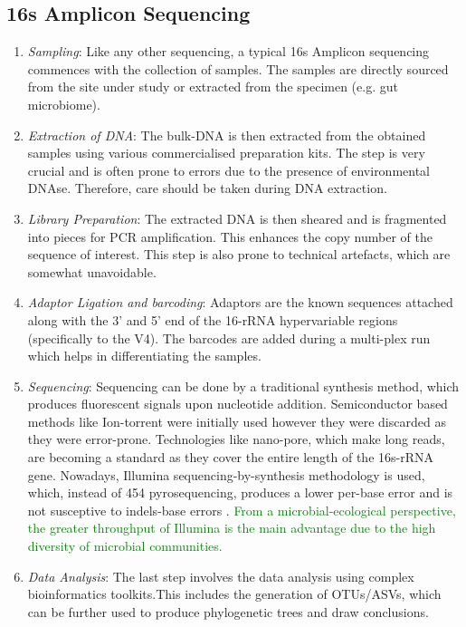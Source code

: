 \subsection{16s Amplicon Sequencing}

\begin{enumerate}
  \item \textit{Sampling}: Like any other sequencing, a typical 16s Amplicon sequencing commences with the collection of samples. The samples are directly sourced from the site under study or extracted from the specimen (e.g. gut microbiome).
  \item \textit{Extraction of DNA}: The bulk-DNA is then extracted from the obtained samples using various commercialised preparation kits. The step is very crucial and is often prone to errors due to the presence of environmental DNAse. Therefore, care should be taken during DNA extraction.
  \item \textit{Library Preparation}: The extracted DNA is then sheared and is fragmented into pieces for PCR amplification. This enhances the copy number of the sequence of interest. This step is also prone to technical artefacts, which are somewhat unavoidable. 
  \item \textit{Adaptor Ligation and barcoding}: Adaptors are the known sequences attached along with the 3' and 5' end of the 16-rRNA hypervariable regions (specifically to the V4). The barcodes are added during a multi-plex run which helps in differentiating the samples.
  \item \textit{Sequencing}: Sequencing can be done by a traditional synthesis method, which produces fluorescent signals upon nucleotide addition. Semiconductor based methods like Ion-torrent were initially used however they were discarded as they were error-prone. Technologies like nano-pore, which make long reads, are becoming a standard as they cover the entire length of the 16s-rRNA gene. Nowadays, Illumina sequencing-by-synthesis methodology is used, which, instead of 454 pyrosequencing, produces a lower per-base error and is not susceptive to indels-base errors \cite{ref14}. \textcolor{green}{From a microbial-ecological perspective, the greater throughput of Illumina is the main advantage due to the high diversity of microbial communities.}
  \item \textit{Data Analysis}: The last step involves the data analysis using complex bioinformatics toolkits.This includes the generation of OTUs/ASVs, which can be further used to produce phylogenetic trees and draw conclusions.
\end{enumerate}

